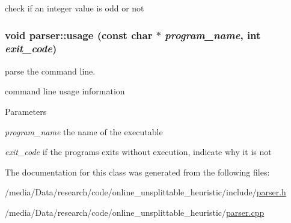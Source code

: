 check if an integer value is odd or not 

\hypertarget{classparser_a6e2620bd81e91a69dc479f307c8b8b72}{
\subsubsection[{usage}]{\setlength{\rightskip}{0pt plus 5cm}void parser::usage (const char $\ast$ {\em program\_\-name}, \/  int {\em exit\_\-code})}}
\label{classparser_a6e2620bd81e91a69dc479f307c8b8b72}


parse the command line. 

command line usage information


\begin{DoxyParams}{Parameters}
\item[{\em program\_\-name}]the name of the executable \item[{\em exit\_\-code}]if the programs exits without execution, indicate why it is not \end{DoxyParams}


The documentation for this class was generated from the following files:\begin{DoxyCompactItemize}
\item 
/media/Data/research/code/online\_\-unsplittable\_\-heuristic/include/\hyperlink{parser_8h}{parser.h}\item 
/media/Data/research/code/online\_\-unsplittable\_\-heuristic/\hyperlink{parser_8cpp}{parser.cpp}\end{DoxyCompactItemize}
